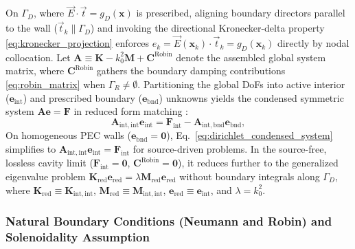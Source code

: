 \documentclass[VANCOUVER,Times1COL]{WileyNJD-v5}
\begin{document}
On $\Gamma_D$, where $\vec{E} \cdot \vec{t} = g_D(\mathbf{x})$ is prescribed, aligning boundary directors parallel to the wall ($\vec{t}_k \parallel \Gamma_D$) and invoking the directional Kronecker-delta property \eqref{eq:kronecker_projection} enforces $e_k = \vec{E}(\mathbf{x}_k) \cdot \vec{t}_k = g_D(\mathbf{x}_k)$ directly by nodal collocation. Let $\mathbf{A} \equiv \mathbf{K} - k_0^2 \mathbf{M} + \mathbf{C}^{\mathrm{Robin}}$ denote the assembled global system matrix, where $\mathbf{C}^{\mathrm{Robin}}$ gathers the boundary damping contributions \eqref{eq:robin_matrix} when $\Gamma_R \ne \emptyset$. Partitioning the global DoFs into active interior ($\mathbf{e}_{\mathrm{int}}$) and prescribed boundary ($\mathbf{e}_{\mathrm{bnd}}$) unknowns yields the condensed symmetric system $\mathbf{A}\mathbf{e} = \mathbf{F}$ in reduced form matching \cite{stable_vnmm2d_2026}:
\begin{equation}
    \mathbf{A}_{\mathrm{int}, \mathrm{int}} \mathbf{e}_{\mathrm{int}} = \mathbf{F}_{\mathrm{int}} - \mathbf{A}_{\mathrm{int}, \mathrm{bnd}} \mathbf{e}_{\mathrm{bnd}},
    \label{eq:dirichlet_condensed_system}
\end{equation}
On homogeneous PEC walls ($\mathbf{e}_{\mathrm{bnd}} = \mathbf{0}$), Eq.~\eqref{eq:dirichlet_condensed_system} simplifies to $\mathbf{A}_{\mathrm{int}, \mathrm{int}} \mathbf{e}_{\mathrm{int}} = \mathbf{F}_{\mathrm{int}}$ for source-driven problems. In the source-free, lossless cavity limit ($\mathbf{F}_{\mathrm{int}} = \mathbf{0}$, $\mathbf{C}^{\mathrm{Robin}} = \mathbf{0}$), it reduces further to the generalized eigenvalue problem $\mathbf{K}_{\mathrm{red}} \mathbf{e}_{\mathrm{red}} = \lambda \mathbf{M}_{\mathrm{red}} \mathbf{e}_{\mathrm{red}}$ without boundary integrals along $\Gamma_D$, where $\mathbf{K}_{\mathrm{red}} \equiv \mathbf{K}_{\mathrm{int},\mathrm{int}}$, $\mathbf{M}_{\mathrm{red}} \equiv \mathbf{M}_{\mathrm{int},\mathrm{int}}$, $\mathbf{e}_{\mathrm{red}} \equiv \mathbf{e}_{\mathrm{int}}$, and $\lambda = k_0^2$.

\subsubsection{Natural Boundary Conditions (Neumann and Robin) and Solenoidality Assumption}
\label{subsubsec:neumann_divergence_treatment}
\end{document}
